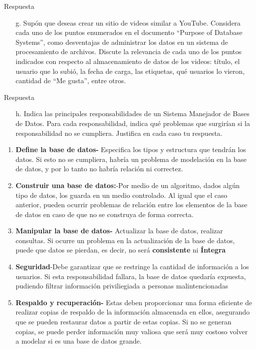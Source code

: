 \documentclass{article}
\begin{document}
\begin{enumerate}
    Respuesta
    
\begin{itemize}
    \item[g.]Supón que deseas crear un sitio de videos similar a YouTube. Considera cada uno de los puntos enumerados en el documento “Purpose of Database Systems”, como desventajas de administrar los datos en un sistema de procesamiento de archivos. Discute la relevancia de cada uno de los puntos indicados con respecto al almacenamiento de datos de los videos: título, el usuario que lo subió, la fecha de carga, las etiquetas, qué usuarios lo vieron, cantidad de “Me gusta”, entre otros.
    \end{itemize}
    
    Respuesta
    
\begin{itemize}
    \item[h.]Indica las principales responsabilidades de un Sistema Manejador de Bases de Datos. Para cada responsabilidad, indica qué problemas que surgirían si la responsabilidad no se cumpliera. Justifica en cada caso tu respuesta.
    \end{itemize}
\begin{enumerate}
\item \textbf{Define la base de datos-} Especifica los tipos y estructura que tendrán los datos. Si esto no se cumpliera, habría un problema de modelación en la base de datos, y por lo tanto no habría relación ni correctez.
\item \textbf{Construir una base de datos:}-Por medio de un algoritmo, dados algún tipo de datos, los guarda en un medio controlado. Al igual que el caso anterior, pueden ocurrir problemas de relación entre los elementos de la base de datos en caso de que no se construya de forma correcta.
\item \textbf{Manipular la base de datos-} Actualizar la base de datos, realizar consultas. Si ocurre un problema en la actualización de la base de datos, puede que datos se pierdan, es decir, no será \textbf{consistente} ni \textbf{Íntegra}
\item \textbf{Seguridad}-Debe garantizar que se restringe la cantidad de información a los usuarios. Si esta responsabilidad fallara, la base de datos quedaría expuesta, pudiendo filtrar información priviliegiada a personas malintencionadas
\item \textbf{Respaldo y recuperación-} Estas deben proporcionar una forma eficiente de realizar copias de respaldo de la información almacenada en ellos, asegurando que se pueden restaurar datos a partir de estas copias. Si no se generan copias, se puede perder información muy valiosa que será muy costoso volver a modelar si es una base de datos grande.

\end{enumerate}
\end{enumerate}
\end{document}
